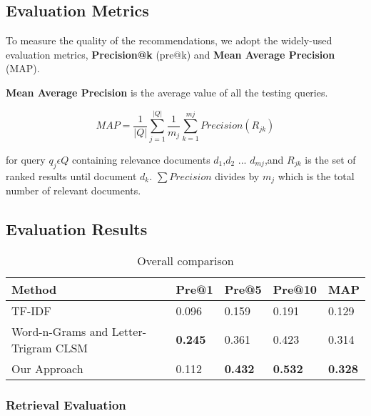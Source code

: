 \subsection{Evaluation Metrics}
To measure the quality of the recommendations, we adopt the widely-used evaluation metrics, {\bf Precision@k} (pre@k) and {\bf Mean Average Precision} (MAP). 
\par
{\bf Mean Average Precision} is the average value of all the testing queries.\par	
\begin{normalsize}
	\begin{equation}
MAP = \frac{1}{|Q|}\sum_{j=1}^{|Q|}\frac{1}{m_j}{\sum_{k=1}^{mj}Precision(R_{jk})}
	\end{equation}
\end{normalsize}
for query $q_j \epsilon Q$  containing relevance documents  $d_1$,$d_2$ ... $d_{mj}$,and $R_{jk}$ is the set of ranked results until document $d_k$. $\sum Precision$ divides by $m_j$ which is the total number of relevant documents.


\subsection{Evaluation Results}
\begin{table}[!h]
	\centering
	\scriptsize
	\begin{tabular}{l|llll}
		\hline    
		Method & Pre@1 & Pre@5 & Pre@10 & MAP \\
		\hline
        TF-IDF  &  0.096 & 0.159 & 0.191 & 0.129  \\
		Word-n-Grams and Letter-Trigram CLSM  &  \textbf{0.245} & 0.361& 0.423 & 0.314 \\
		Our Approach &  0.112 & \textbf{0.432} & \textbf{0.532} & \textbf{0.328} \\
		\hline    
		
	\end{tabular} 
	\label{tab:evaluation}
	\caption{Overall comparison}
\end{table}		

\subsubsection{Retrieval Evaluation}

